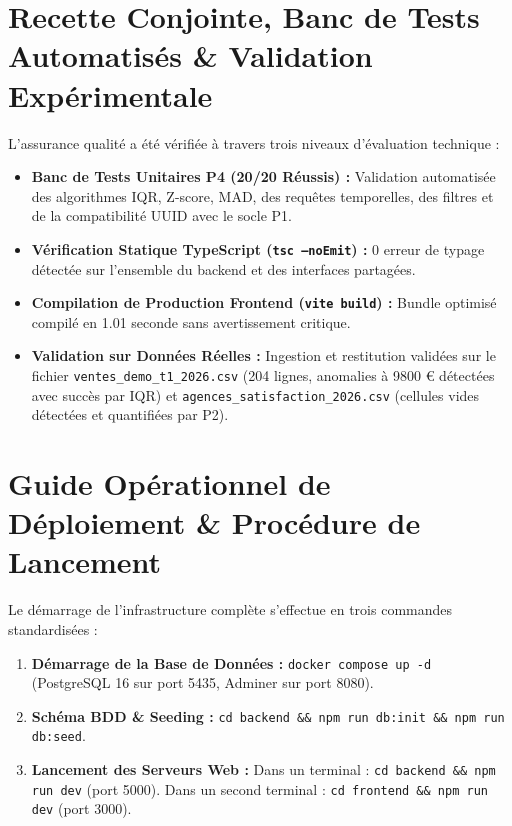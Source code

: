 \documentclass[11pt,a4paper]{article}
\begin{document}
\section{Recette Conjointe, Banc de Tests Automatisés \& Validation Expérimentale}

L'assurance qualité a été vérifiée à travers trois niveaux d'évaluation technique :
\begin{itemize}[leftmargin=1.5cm, label=\textcolor{brandblue}{\textbullet}]
    \item \textbf{Banc de Tests Unitaires P4 (20/20 Réussis) :} Validation automatisée des algorithmes IQR, Z-score, MAD, des requêtes temporelles, des filtres et de la compatibilité UUID avec le socle P1.
    \item \textbf{Vérification Statique TypeScript (\texttt{tsc --noEmit}) :} 0 erreur de typage détectée sur l'ensemble du backend et des interfaces partagées.
    \item \textbf{Compilation de Production Frontend (\texttt{vite build}) :} Bundle optimisé compilé en 1.01 seconde sans avertissement critique.
    \item \textbf{Validation sur Données Réelles :} Ingestion et restitution validées sur le fichier \texttt{ventes\_demo\_t1\_2026.csv} (204 lignes, anomalies à 9800 € détectées avec succès par IQR) et \texttt{agences\_satisfaction\_2026.csv} (cellules vides détectées et quantifiées par P2).
\end{itemize}

\section{Guide Opérationnel de Déploiement \& Procédure de Lancement}

Le démarrage de l'infrastructure complète s'effectue en trois commandes standardisées :
\begin{enumerate}[leftmargin=1.5cm, label=\textbf{\color{brandblue}Étape \arabic* :}]
    \item \textbf{Démarrage de la Base de Données :} \texttt{docker compose up -d} (PostgreSQL 16 sur port 5435, Adminer sur port 8080).
    \item \textbf{Schéma BDD \& Seeding :} \texttt{cd backend \&\& npm run db:init \&\& npm run db:seed}.
    \item \textbf{Lancement des Serveurs Web :} Dans un terminal : \texttt{cd backend \&\& npm run dev} (port 5000). Dans un second terminal : \texttt{cd frontend \&\& npm run dev} (port 3000).
\end{enumerate}
\end{document}
